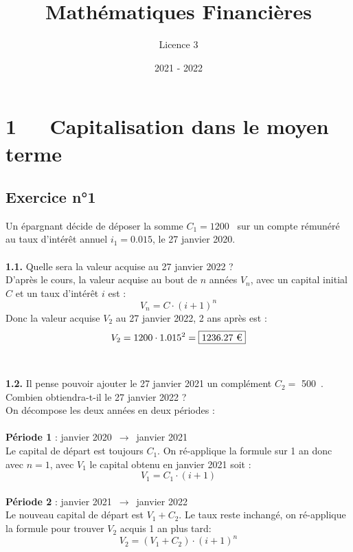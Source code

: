 \documentclass{article}
\title{Mathématiques Financières}
\author{Licence 3}
\date{2021 - 2022}
\begin{document}
\normalsize
\maketitle

\renewcommand*\contentsname{Table des matières}
\tableofcontents
\newpage

\section{1   Capitalisation dans le moyen terme}
\subsection{Exercice n°1}
\textcolor{exogris}{
Un épargnant décide de déposer la somme $C_1 = 1200$ \texteuro sur un compte rémunéré au taux d’intérêt annuel $i_1 = 0.015$, le 27 janvier 2020.
}
\\\\ \textcolor{exogris}{\textbf{1.1.}
Quelle sera la valeur acquise au 27 janvier 2022 ?
}
\\%
D'après le cours, la valeur acquise au bout de $n$ années $V_n$, avec un capital initial $C$ et un taux d'intérêt $i$ est :
$$V_n = C\cdot(i+1)^n$$
Donc la valeur acquise $V_2$ au 27 janvier 2022, 2 ans après est :
$$V_2 = 1200 \cdot 1.015^2 = \boxed{1236.27 \text{ \texteuro}}$$
\\%
\\%
\textcolor{exogris}{\textbf{1.2.}
Il pense pouvoir ajouter le 27 janvier 2021 un complément $C_2 =$ 500 \texteuro. Combien obtiendra-t-il le 27 janvier 2022 ?
}
\\%
On décompose les deux années en deux périodes :
\\\\\textbf{Période 1} : janvier 2020 $\rightarrow$ janvier 2021
\\Le capital de départ est toujours $C_1$. On ré-applique la formule sur 1 an donc avec $n=1$, avec $V_1$ le capital obtenu en janvier 2021 soit :
$$V_1 = C_1 \cdot (i+1)$$
\\\textbf{Période 2} : janvier 2021 $\rightarrow$ janvier 2022
\\Le nouveau capital de départ est $V_1 + C_2$.
Le taux reste inchangé, on ré-applique la formule pour trouver $V_2$ acquis 1 an plus tard:
$$V_2 = (V_1 + C_2) \cdot (i+1)^n $$
\end{document}
